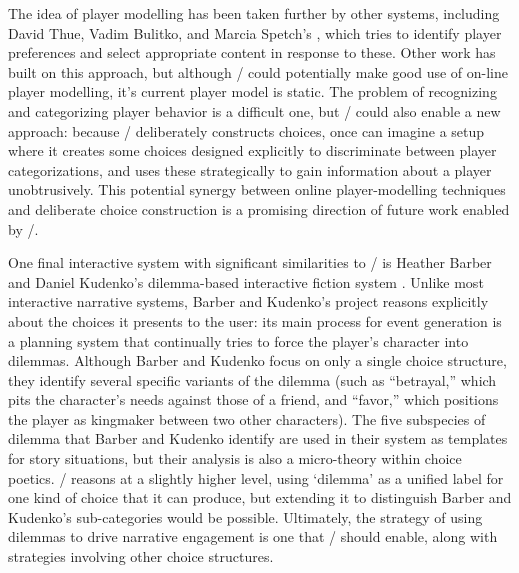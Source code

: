 The idea of player modelling has been taken further by other systems, including  David Thue, Vadim Bulitko, and Marcia Spetch's  \citep{Thue2008}, which tries to identify player preferences and select appropriate content in response to these.
%
Other work has built on this approach, but although \dunyazad/ could potentially make good use of on-line player modelling, it's current player model is static.
%
The problem of recognizing and categorizing player behavior is a difficult one, but \dunyazad/ could also enable a new approach: because \dunyazad/ deliberately constructs choices, once can imagine a setup where it creates some choices designed explicitly to discriminate between player categorizations, and uses these strategically to gain information about a player unobtrusively.
%
This potential synergy between online player-modelling techniques and deliberate choice construction is a promising direction of future work enabled by \dunyazad/.


One final interactive system with significant similarities to \dunyazad/ is Heather Barber and Daniel Kudenko's dilemma-based interactive fiction system \citep{Barber2007}.
%
Unlike most interactive narrative systems, Barber and Kudenko's project reasons explicitly about the choices it presents to the user: its main process for event generation is a planning system that continually tries to force the player's character into dilemmas.
%
Although Barber and Kudenko focus on only a single choice structure, they identify several specific variants of the dilemma (such as ``betrayal,'' which pits the character's needs against those of a friend, and ``favor,'' which positions the player as kingmaker between two other characters).
%
The five subspecies of dilemma that Barber and Kudenko identify are used in their system as templates for story situations, but their analysis is also a micro-theory within choice poetics.
%
\dunyazad/ reasons at a slightly higher level, using `dilemma' as a unified label for one kind of choice that it can produce, but extending it to distinguish Barber and Kudenko's sub-categories would be possible.
%
Ultimately, the strategy of using dilemmas to drive narrative engagement is one that \dunyazad/ should enable, along with strategies involving other choice structures.




